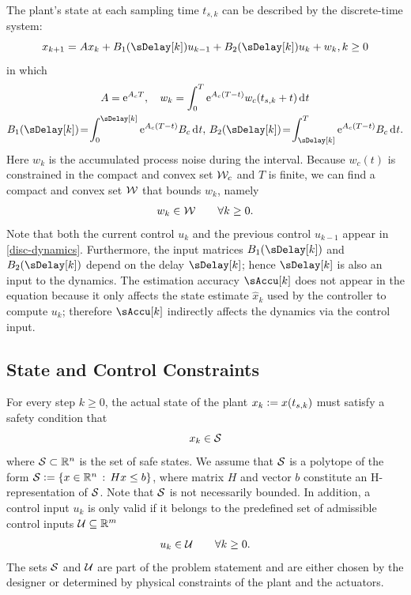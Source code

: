 The plant's state at each sampling time $t_{s,k}$ can be described
by the discrete-time system:
\begin{equation}
x_{k+1}=Ax_{k}+B_{1}(\sDelay[k])u_{k-1}+B_{2}(\sDelay[k])u_{k}+w_{k}, k\geq0\label{eq:disc-dynamics} %
\end{equation}
in which
\begin{gather*}
A=\eu^{A_{c}T}, \quad
w_{k}%
=\int_{0}^{T}\eu^{A_{c}(T-t)}w_{c}(t_{s,k}+t)\diff t \\
B_{1}(\sDelay[k])%
\!=\!\int_{0}^{\sDelay[k]}\eu^{A_{c}(T-t)}B_{c}\diff t,\,
B_{2}(\sDelay[k])%
\!=\!\int_{\sDelay[k]}^{T}\eu^{A_{c}(T-t)}B_{c}\diff t \text.
\end{gather*}
Here $w_{k}$ is the accumulated process noise during the interval.
Because $w_{c}(t)$ is constrained in the compact and convex set $\mathcal{W}_{c}$
and $T$ is finite, we can find a compact and convex set $\mathcal{W}$
that bounds $w_{k}$, namely
\begin{equation}
w_{k}\in\mathcal{W}\qquad\forall k\geq0\text{.}\label{eq:disturb-constraint}
\end{equation}
Note that both the current control $u_{k}$ and the previous
control $u_{k-1}$ appear %
in \eqref{disc-dynamics}.
Furthermore, the input matrices $B_{1}(\sDelay[k])$ and $B_{2}(\sDelay[k])$
depend on the delay $\sDelay[k]$; hence $\sDelay[k]$ is also an
input to the dynamics. The estimation accuracy $\sAccu[k]$ does not
appear in the equation because it only affects the state estimate
$\hat{x}_{k}$ %
used by the controller to compute $u_{k}$;
therefore $\sAccu[k]$ indirectly affects the dynamics via the control
input.


\subsection{State and Control Constraints}

For every step $k\geq0$, the actual state of the plant $x_{k}\mathrel{\mathop:}= x(t_{s,k})$
must satisfy a safety condition that 
\begin{equation}
x_{k}\in\mathcal{S}\label{eq:state-constraint}
\end{equation}
where $\mathcal{S}\subset\mathbb{R}^{n}$ is the set of safe states. We assume
that $\mathcal{S}$ is a polytope of the form $\mathcal{S}\mathrel{\mathop:}=\{ x\in\mathbb{R}^{n}\,:\, Hx\leq b\} $,
where matrix $H$ and vector $b$ constitute an H-representation
of $\mathcal{S}$.
Note that $\mathcal{S}$ is not necessarily bounded. In addition, a control
input $u_{k}$ is only valid if it belongs to the predefined set of
admissible control inputs $\mathcal{U}\subseteq\mathbb{R}^{m}$ %
\begin{equation}
u_{k}\in\mathcal{U}\qquad\forall k\geq0\text{.}\label{eq:input-constraint}
\end{equation}
The sets $\mathcal{S}$ and $\mathcal{U}$ are part of the problem statement and
are either chosen by the designer or determined by physical constraints
of the plant and the actuators.


